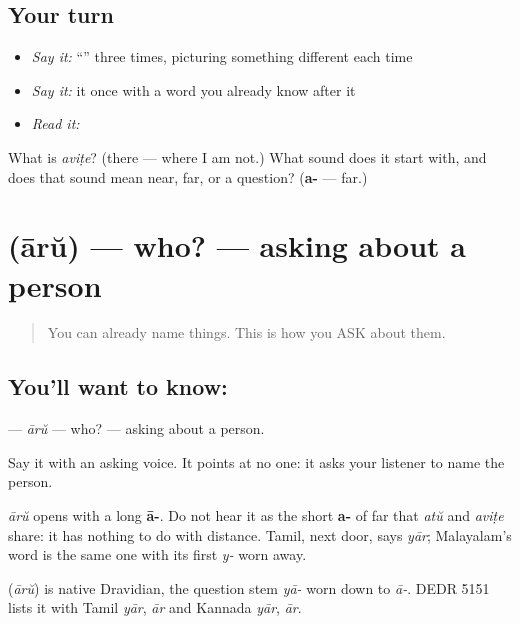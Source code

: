 \subsection*{Your turn}
\begin{itemize}
\raggedright
  \item \emph{Say it:} \textquotedblleft{}\textquotedblright{} three times, picturing something different each time
  \item \emph{Say it:} it once with a word you already know after it
  \item \emph{Read it:} \textbf{}
\end{itemize}

\begin{tcolorbox}[breakable,colback=teal!4,colframe=teal!35!black,title={Before you move on}]
What is \emph{aviṭe}? (there — where I am not.) What sound does it start with, and does that sound mean near, far, or a question? (\textbf{a-} — far.)
\end{tcolorbox}
\section[\texorpdfstring{\ml{ആര്} (ārŭ)}{ആര് (ārŭ)}]{ (ārŭ) — who? — asking about a person}

\label{lesson:ML-C41-who}



\begin{quote}
You can already name things. This is how you ASK about them.
\end{quote}

\subsection*{You'll want to know: }
\textbf{} — \emph{ārŭ} — who? — asking about a person.

Say it with an asking voice. It points at no one: it asks your listener to name the person.

\emph{ārŭ} opens with a long \textbf{ā-}. Do not hear it as the short \textbf{a-} of far that \textbf{} \emph{atŭ} and \textbf{} \emph{aviṭe} share: it has nothing to do with distance. Tamil, next door, says \emph{yār}; Malayalam's word is the same one with its first \emph{y-} worn away.

\begin{cousinweb}
\textbf{} (\emph{ārŭ}) is native Dravidian, the question stem \emph{yā-} worn down to \emph{ā-}. DEDR 5151 lists it with Tamil \emph{yār}, \emph{ār} and Kannada \emph{yār}, \emph{ār}.
\end{cousinweb}

